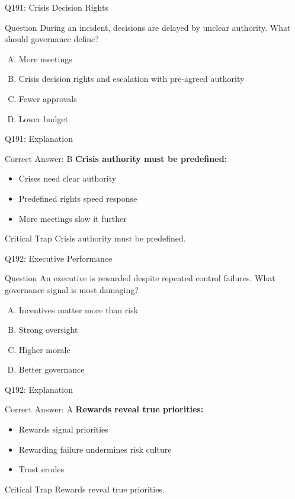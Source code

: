 \documentclass{beamer}
\begin{document}
	\begin{frame}{Q191: Crisis Decision Rights}
		\begin{block}{Question}
			During an incident, decisions are delayed by unclear authority. What should governance define?
		\end{block}
		\begin{enumerate}[(A)]
			\item More meetings
			\item Crisis decision rights and escalation with pre-agreed authority
			\item Fewer approvals
			\item Lower budget
		\end{enumerate}
	\end{frame}
	
	\begin{frame}{Q191: Explanation}
		\begin{block}{Correct Answer: B}
			\textbf{Crisis authority must be predefined:}
			\begin{itemize}
				\item Crises need clear authority
				\item Predefined rights speed response
				\item More meetings slow it further
			\end{itemize}
		\end{block}
		\begin{alertblock}{Critical Trap}
			Crisis authority must be predefined.
		\end{alertblock}
	\end{frame}
	
	\begin{frame}{Q192: Executive Performance}
		\begin{block}{Question}
			An executive is rewarded despite repeated control failures. What governance signal is most damaging?
		\end{block}
		\begin{enumerate}[(A)]
			\item Incentives matter more than risk
			\item Strong oversight
			\item Higher morale
			\item Better governance
		\end{enumerate}
	\end{frame}
	
	\begin{frame}{Q192: Explanation}
		\begin{block}{Correct Answer: A}
			\textbf{Rewards reveal true priorities:}
			\begin{itemize}
				\item Rewards signal priorities
				\item Rewarding failure undermines risk culture
				\item Trust erodes
			\end{itemize}
		\end{block}
		\begin{alertblock}{Critical Trap}
			Rewards reveal true priorities.
		\end{alertblock}
	\end{frame}
	
\end{document}

